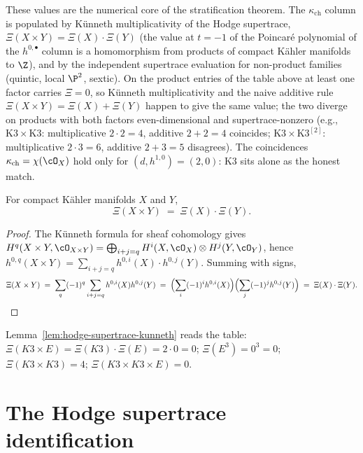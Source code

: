 These values are the numerical core of the stratification theorem. The
$\kappa_{\mathrm{ch}}$ column is populated by K\"unneth multiplicativity of
the Hodge supertrace,
$\Xi(X \times Y) = \Xi(X) \cdot \Xi(Y)$ (the value at $t = -1$ of the
Poincar\'e polynomial of the $h^{0,\bullet}$ column is a homomorphism from
products of compact K\"ahler manifolds to $\Z$), and by the independent
supertrace evaluation for non-product families (quintic, local $\P^2$,
sextic). On the product entries of the table above at least one factor
carries $\Xi = 0$, so K\"unneth multiplicativity and the naive additive
rule $\Xi(X \times Y) = \Xi(X) + \Xi(Y)$ happen to give the same value; the
two diverge on products with both factors even-dimensional and
supertrace-nonzero (e.g., $\mathrm{K3} \times \mathrm{K3}$: multiplicative
$2 \cdot 2 = 4$, additive $2 + 2 = 4$ coincides; $\mathrm{K3} \times
\mathrm{K3}^{[2]}$: multiplicative $2 \cdot 3 = 6$, additive $2 + 3 = 5$
disagrees). The coincidences $\kappa_{\mathrm{ch}} = \chi(\cO_X)$ hold only
for $(d, h^{1,0}) = (2, 0)$: K3 sits alone as the honest match.

\begin{lemma}
\label{lem:hodge-supertrace-kunneth}
For compact K\"ahler manifolds $X$ and $Y$,
\[
 \Xi(X \times Y) \;=\; \Xi(X) \cdot \Xi(Y).
\]
\end{lemma}

\begin{proof}
The K\"unneth formula for sheaf cohomology gives
$H^q(X \times Y, \cO_{X \times Y}) = \bigoplus_{i + j = q} H^i(X, \cO_X) \otimes H^j(Y, \cO_Y)$,
hence
$h^{0, q}(X \times Y) = \sum_{i + j = q} h^{0, i}(X) \cdot h^{0, j}(Y)$. Summing with signs,
\[
 \Xi(X \times Y)
 \;=\; \sum_q (-1)^q \sum_{i + j = q} h^{0, i}(X) h^{0, j}(Y)
 \;=\; \Bigl(\sum_i (-1)^i h^{0, i}(X)\Bigr) \Bigl(\sum_j (-1)^j h^{0, j}(Y)\Bigr)
 \;=\; \Xi(X) \cdot \Xi(Y). \qedhere
\]
\end{proof}

Lemma~\ref{lem:hodge-supertrace-kunneth} reads the table: $\Xi(K3 \times E) = \Xi(K3) \cdot \Xi(E) = 2 \cdot 0 = 0$; $\Xi(E^3) = 0^3 = 0$; $\Xi(K3 \times K3) = 4$; $\Xi(K3 \times K3 \times E) = 0$.

\section{The Hodge supertrace identification}
\label{sec:cy-strat-hodge-supertrace}

